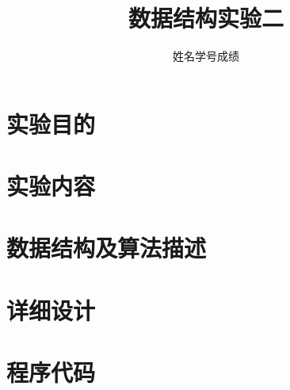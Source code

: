 \documentclass{ctexart}
\title{\huge 数据结构实验二}
\author{姓名学号成绩}
\date{}
\begin{document}
\maketitle


\section{实验目的}

\section{实验内容}

\section{数据结构及算法描述}

\section{详细设计}

\section{程序代码}
\end{document}
